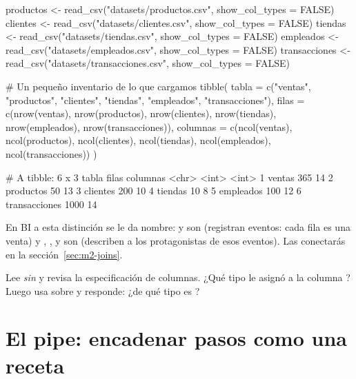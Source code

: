 \begin{rcode}
productos     <- read_csv("datasets/productos.csv",
                          show_col_types = FALSE)
clientes      <- read_csv("datasets/clientes.csv",
                          show_col_types = FALSE)
tiendas       <- read_csv("datasets/tiendas.csv",
                          show_col_types = FALSE)
empleados     <- read_csv("datasets/empleados.csv",
                          show_col_types = FALSE)
transacciones <- read_csv("datasets/transacciones.csv",
                          show_col_types = FALSE)

# Un pequeño inventario de lo que cargamos
tibble(
  tabla    = c("ventas", "productos", "clientes", "tiendas",
               "empleados", "transacciones"),
  filas    = c(nrow(ventas), nrow(productos), nrow(clientes),
               nrow(tiendas), nrow(empleados), nrow(transacciones)),
  columnas = c(ncol(ventas), ncol(productos), ncol(clientes),
               ncol(tiendas), ncol(empleados), ncol(transacciones))
)
\end{rcode}
\begin{rsalida}
# A tibble: 6 x 3
  tabla         filas columnas
  <chr>         <int>    <int>
1 ventas          365       14
2 productos        50       13
3 clientes        200       10
4 tiendas          10        8
5 empleados       100       12
6 transacciones  1000       14
\end{rsalida}

En BI a esta distinción se le da nombre:  y
 son  (registran eventos:
cada fila es una venta) y , ,
 y  son 
(describen a los protagonistas de esos eventos). Las conectarás en la
sección~\ref{sec:m2-joins}.

\begin{hazlotu}
Lee  \emph{sin}
 y revisa la especificación de columnas.
¿Qué tipo le asignó  a la columna ? Luego usa
 sobre  y responde: ¿de qué tipo es
?
\end{hazlotu}

\section{El pipe: encadenar pasos como una receta}
\label{sec:m2-pipe}

